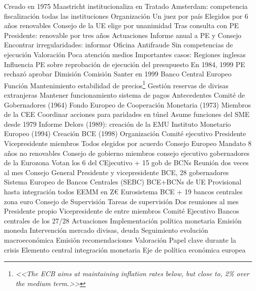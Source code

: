 \documentclass{nuevotema}
\begin{document}
\begin{esquemal}
				\4 Creado en 1975
				\4 Maastricht institucionaliza en Tratado
				\4 Amsterdam: competencia fiscalización todas las instituciones
			\3 Organización
				\4 Un juez por país
				\4 Elegidos por 6 años renovables
				\4 Consejo de la UE elige por unanimidad
				\4[] Tras consulta con PE
				\4 Presidente: renovable por tres años
			\3 Actuaciones
				\4 Informe anual a PE y Consejo
				\4 Encontrar irregularidades: informar Oficina Antifraude
				\4 Sin competencias de ejecución
			\3 Valoración
				\4 Poca atención medios
				\4 Importantes casos:
				\4[] Regiones inglesas
				\4[] Influencia PE sobre reprobación de ejecución del presupuesto
				\4[] En 1984, 1999 PE rechazó aprobar
				\4[] Dimisión Comisión Santer en 1999
		\2 Banco Central Europeo
			\3 Función
				\4 Mantenimiento estabilidad de precios\footnote{\textit{<<The ECB aims at maintaining inflation rates below, but close to, 2\% over the medium term.>>}}
				\4 Gestión reservas de divisas extranjeras
				\4 Mantener funcionamiento sistema de pagos
			\3 Antecedentes
				\4 Comité de Gobernadores (1964)
				\4 Fondo Europeo de Cooperación Monetaria (1973)
				\4[] Miembros de la CEE
				\4[] Coordinar acciones para paridades en túnel
				\4[] Asume funciones del SME desde 1979
				\4 Informe Delors (1989): creación de la EMU
				\4 Instituto Monetario Europeo (1994)
				\4 Creación BCE (1998)
			\3 Organización
				\4 Comité ejecutivo
				\4[] Presidente
				\4[] Vicepresidente
				\4[] 4 miembros
				\4[] Todos elegidos por acuerdo Consejo Europeo
				\4[] Mandato 8 años no renovables
				\4 Consejo de gobierno
				 miembros consejo ejecutivo
				 gobernadores de la Eurozona
				\4[] Votan los 6 del CEjecutivo + 15 gob de BCNs
				\4[] Reunión dos veces al mes
				\4 Consejo General
				\4[] Presidente y vicepresidente BCE, 28 gobernadores
				\4 Sistema Europeo de Bancos Centrales (SEBC)
				\4[] BCE+BCNs de UE
				\4[] Provisional hasta integración todos EEMM en Z€
				\4 Eurosistema
				\4[] BCE + 19 bancos centrales zona euro
				\4 Consejo de Supervisión
				\4[] Tareas de supervisión
				\4[] Dos reuniones al mes
				\4[] Presidente propio
				\4[] Vicepresidente de entre miembros Comité Ejecutivo
				\4[] Bancos centrales de los 27/28
			\3 Actuaciones
				\4 Implementación política monetaria
				\4 Emisión moneda
				\4 Intervención mercado divisas, deuda
				\4 Seguimiento evolución macroeconómica
				\4 Emisión recomendaciones
			\3 Valoración
				\4 Papel clave durante la crisis
				\4 Elemento central integración monetaria
				\4 Eje de política económica europea

\end{esquemal}
\end{document}
